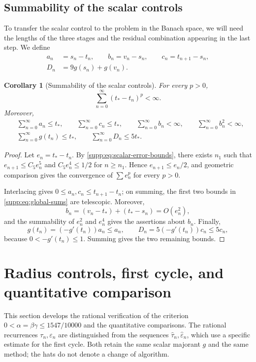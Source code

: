 \documentclass[11pt,a4paper]{article}
\numberwithin{equation}{section}
\numberwithin{table}{section}
\theoremstyle{plain}
\newtheorem{corollary}[theorem]{Corollary}
\theoremstyle{definition}\newtheorem{definition}[theorem]{Definition}
\theoremstyle{remark}\newtheorem{remark}[theorem]{Remark}
\begin{document}
\subsection{Summability of the scalar controls}

To transfer the scalar control to the problem in the Banach space, we
will need the lengths of the three stages and the residual combination
appearing in the last step. We define
\begin{equation*}
\begin{aligned}
a_n&=s_n-t_n,\qquad b_n=v_n-s_n,\qquad
c_n=t_{n+1}-s_n,\\
D_n&=9g(s_n)+g(v_n).
\end{aligned}
\end{equation*}

\begin{corollary}[Summability of the scalar controls]
\label{supp:cor:global-sums}
For every $p>0$,
\[
\sum_{n=0}^{\infty}(t_*-t_n)^p<\infty.
\]
Moreover,
\begin{equation}
\begin{aligned}
&\sum_{n=0}^{\infty}a_n\leq t_*,\qquad
\sum_{n=0}^{\infty}c_n\leq t_*,\qquad
\sum_{n=0}^{\infty}b_n<\infty,
\qquad \sum_{n=0}^{\infty}b_n^2<\infty,\\
&\sum_{n=0}^{\infty}g(t_n)\leq t_*,\qquad
\sum_{n=0}^{\infty}D_n\leq5t_*.
\end{aligned}
\label{supp:eq:global-sums}
\end{equation}
\end{corollary}

\begin{proof}
Let $e_n=t_*-t_n$. By \eqref{supp:eq:scalar-error-bounds}, there exists
$n_1$ such that $e_{n+1}\leq C_5e_n^5$ and $C_5e_n^4\leq1/2$ for
$n\geq n_1$. Hence $e_{n+1}\leq e_n/2$, and geometric comparison
gives the convergence of $\sum e_n^p$ for every $p>0$.

Interlacing gives $0\leq a_n,c_n\leq t_{n+1}-t_n$; on summing, the
first two bounds in \eqref{supp:eq:global-sums} are telescopic.
Moreover,
\[
b_n=(v_n-t_*)+(t_*-s_n)=O(e_n^2),
\]
and the summability of $e_n^2$ and $e_n^4$ gives the assertions about
$b_n$. Finally,
\[
g(t_n)=(-g'(t_n))a_n\leq a_n,
\qquad
D_n=5(-g'(t_n))c_n\leq5c_n,
\]
because $0<-g'(t_n)\leq1$. Summing gives the two remaining bounds.
\end{proof}



\section{Radius controls, first cycle, and quantitative comparison}
\label{supp:radial}
This section develops the rational verification of the criterion
$0<\alpha=\beta\gamma\leq1547/10000$ and the quantitative comparisons.
The rational recurrences $\tau_n,\varepsilon_n$ are distinguished
from the sequences $\widehat\tau_n,\widehat\varepsilon_n$, which use
a specific estimate for the first cycle. Both retain the same scalar
majorant $g$ and the same method; the hats do not denote a change
of algorithm.
\end{document}
